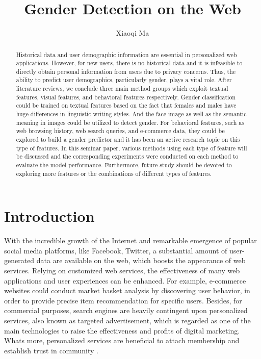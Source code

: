 \documentclass[runningheads]{llncs}
\begin{document}
	
	\title{Gender Detection on the Web}
	\author{Xiaoqi Ma}
	\maketitle  
	
	\begin{abstract}
		
		Historical data and user demographic information are essential in personalized web applications. However, for new users, there is no historical data and it is infeasible to directly obtain personal information from users due to privacy concerns. Thus, the ability to predict user demographics, particularly gender, plays a vital role. After literature reviews, we conclude three main method groups which exploit textual features, visual features, and behavioral features respectively. Gender classification could be trained on textual features based on the fact that females and males have huge differences in linguistic writing styles. And the face image as well as the semantic meaning in images could be utilized to detect gender. For behavioral features, such as web browsing history, web search queries, and e-commerce data, they could be explored to build a gender predictor and it has been an active research topic on this type of features. In this seminar paper, various methods using each type of feature will be discussed and the corresponding experiments were conducted on each method to evaluate the model performance. Furthermore, future study should be devoted to exploring more features or the combinations of different types of features. 
		
	\end{abstract}
	
	\section{Introduction}
	
	With the incredible growth of the Internet and remarkable emergence of popular social media platforms, like Facebook, Twitter, a substantial amount of user-generated data are available on the web, which boosts the appearance of web services. Relying on customized web services, the effectiveness of many web applications and user experiences can be enhanced. For example, e-commerce websites could conduct market basket analysis by discovering user behavior, in order to provide precise item recommendation for specific users. Besides, for commercial purposes, search engines are heavily contingent upon personalized services, also known as targeted advertisement, which is regarded as one of the main technologies to raise the effectiveness and profits of digital marketing. What\textquotesingle s more, personalized services are beneficial to attach membership and establish trust in community \cite{zhong2015you}.\\
	
\end{document}
